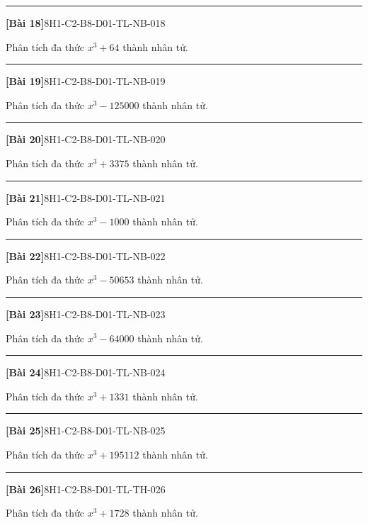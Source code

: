\documentclass[12pt,a4paper]{article}
\newif\ifloigiai
\newenvironment{cauhoi}[2]{%
  \par\medskip\noindent\rule{\textwidth}{0.4pt}\par\nopagebreak
  \noindent\textbf{[#1]}\hfill{\scriptsize\ttfamily #2}\par\nopagebreak\smallskip}{\par}
\newcommand{\loigiai}[1]{\ifloigiai\par\smallskip\noindent\textit{Lời giải.} #1\par\fi}
\begin{document}
\begin{cauhoi}{Bài 18}{8H1-C2-B8-D01-TL-NB-018}
Phân tích đa thức $x^{3}+64$ thành nhân tử.
\loigiai{Áp dụng hằng đẳng thức $a^{3}+b^{3}=(a+b)(a^{2}-ab+b^{2})$ với $b=4$: $x^{3}+64=(x+4)(x^{2}-4x+16)$.}
\end{cauhoi}
\begin{cauhoi}{Bài 19}{8H1-C2-B8-D01-TL-NB-019}
Phân tích đa thức $x^{3}-125000$ thành nhân tử.
\loigiai{Áp dụng hằng đẳng thức $a^{3}-b^{3}=(a-b)(a^{2}+ab+b^{2})$ với $b=50$: $x^{3}-125000=(x-50)(x^{2}+50x+2500)$.}
\end{cauhoi}
\begin{cauhoi}{Bài 20}{8H1-C2-B8-D01-TL-NB-020}
Phân tích đa thức $x^{3}+3375$ thành nhân tử.
\loigiai{Áp dụng hằng đẳng thức $a^{3}+b^{3}=(a+b)(a^{2}-ab+b^{2})$ với $b=15$: $x^{3}+3375=(x+15)(x^{2}-15x+225)$.}
\end{cauhoi}
\begin{cauhoi}{Bài 21}{8H1-C2-B8-D01-TL-NB-021}
Phân tích đa thức $x^{3}-1000$ thành nhân tử.
\loigiai{Áp dụng hằng đẳng thức $a^{3}-b^{3}=(a-b)(a^{2}+ab+b^{2})$ với $b=10$: $x^{3}-1000=(x-10)(x^{2}+10x+100)$.}
\end{cauhoi}
\begin{cauhoi}{Bài 22}{8H1-C2-B8-D01-TL-NB-022}
Phân tích đa thức $x^{3}-50653$ thành nhân tử.
\loigiai{Áp dụng hằng đẳng thức $a^{3}-b^{3}=(a-b)(a^{2}+ab+b^{2})$ với $b=37$: $x^{3}-50653=(x-37)(x^{2}+37x+1369)$.}
\end{cauhoi}
\begin{cauhoi}{Bài 23}{8H1-C2-B8-D01-TL-NB-023}
Phân tích đa thức $x^{3}-64000$ thành nhân tử.
\loigiai{Áp dụng hằng đẳng thức $a^{3}-b^{3}=(a-b)(a^{2}+ab+b^{2})$ với $b=40$: $x^{3}-64000=(x-40)(x^{2}+40x+1600)$.}
\end{cauhoi}
\begin{cauhoi}{Bài 24}{8H1-C2-B8-D01-TL-NB-024}
Phân tích đa thức $x^{3}+1331$ thành nhân tử.
\loigiai{Áp dụng hằng đẳng thức $a^{3}+b^{3}=(a+b)(a^{2}-ab+b^{2})$ với $b=11$: $x^{3}+1331=(x+11)(x^{2}-11x+121)$.}
\end{cauhoi}
\begin{cauhoi}{Bài 25}{8H1-C2-B8-D01-TL-NB-025}
Phân tích đa thức $x^{3}+195112$ thành nhân tử.
\loigiai{Áp dụng hằng đẳng thức $a^{3}+b^{3}=(a+b)(a^{2}-ab+b^{2})$ với $b=58$: $x^{3}+195112=(x+58)(x^{2}-58x+3364)$.}
\end{cauhoi}
\begin{cauhoi}{Bài 26}{8H1-C2-B8-D01-TL-TH-026}
Phân tích đa thức $x^{3}+1728$ thành nhân tử.
\loigiai{Áp dụng hằng đẳng thức $a^{3}+b^{3}=(a+b)(a^{2}-ab+b^{2})$ với $b=12$: $x^{3}+1728=(x+12)(x^{2}-12x+144)$.}
\end{cauhoi}
\end{document}
